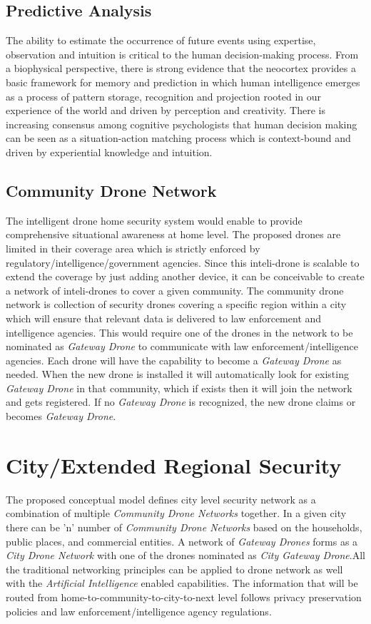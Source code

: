 \documentclass[sigconf]{acmart}
\begin{document}
\subsection{Predictive Analysis }
The ability to estimate the occurrence of future events using expertise, observation and intuition is critical to the human decision-making process. From a biophysical perspective, there is strong evidence that the neocortex provides a basic framework for memory and prediction in which human intelligence emerges as a process of pattern storage, recognition and projection rooted in our experience of the world and driven by perception and creativity. There is increasing consensus among cognitive psychologists that human decision making can be seen as a situation-action matching process which is context-bound and driven by experiential knowledge and intuition.

\subsection{Community Drone Network}
The intelligent drone home security system would enable to provide comprehensive situational awareness at home level. The proposed drones are limited in their coverage area which is strictly enforced by regulatory/intelligence/government agencies. Since this inteli-drone is scalable to extend the coverage by just adding another device, it can be conceivable to create a network of inteli-drones to cover a given community. The community drone network is collection of security drones covering a specific region within a city which will ensure that relevant data is delivered to law enforcement and intelligence agencies. This would require one of the drones in the network to be nominated as \textit{Gateway Drone} to communicate with law enforcement/intelligence agencies. Each drone will have the capability to become a \textit{Gateway Drone} as needed. When the new drone is installed it will automatically look for existing \textit{Gateway Drone} in that community, which if exists then it will join the network and gets registered. If no \textit{Gateway Drone} is recognized, the new drone claims or becomes \textit{Gateway Drone}.

\section{City/Extended Regional Security}
The proposed conceptual model defines city level security network as a combination of multiple \textit{Community Drone Networks} together. In a given city there can be 'n' number of \textit{Community Drone Networks} based on the households, public places, and commercial entities. A network of \textit{Gateway Drones} forms as a \textit{City Drone Network} with one of the drones nominated as \textit{City Gateway Drone}.All the traditional networking principles can be applied to drone network as well with the \textit{Artificial Intelligence} enabled capabilities.
The information that will be routed from home-to-community-to-city-to-next level follows privacy preservation policies and law enforcement/intelligence agency regulations.
\end{document}
